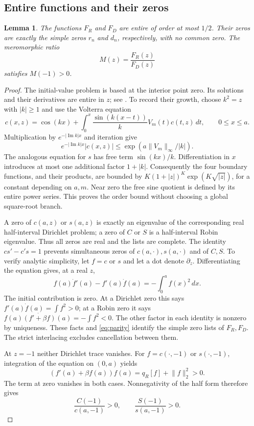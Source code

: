 \documentclass[11pt]{article}
\newtheorem{lemma}[theorem]{Lemma}
\newcommand{\norm}[1]{\lVert#1\rVert}
\DeclareMathOperator{\Impart}{Im}
\begin{document}
\subsection{Entire functions and their zeros}

\begin{lemma}\label{lem:products}
The functions $F_R$ and $F_D$ are entire of order at most $1/2$.
Their zeros are exactly the simple zeros $r_n$ and $d_n$, respectively,
with no common zero. The meromorphic ratio
\[
 M(z)=\frac{F_R(z)}{F_D(z)}
\]
satisfies $M(-1)>0$.
\end{lemma}

\begin{proof}
The initial-value problem is based at the interior point zero.
Its solutions and their derivatives are entire in $z$; see
\cite[Theorem 9.1]{T}. To record their growth, choose $k^2=z$ with
$|k|\geq1$ and use the Volterra equation
\[
 c(x,z)=\cos(kx)+\int_0^x\frac{\sin(k(x-t))}{k}V_m(t)c(t,z)\,dt,
 \qquad 0\leq x\leq a.
\]
Multiplication by $e^{-|\Impart k|x}$ and iteration give
\[
 e^{-|\Impart k|x}|c(x,z)|\leq\exp(a\norm{V_m}_\infty/|k|).
\] The analogous equation for $s$
has free term $\sin(kx)/k$. Differentiation in $x$ introduces at most
one additional factor $1+|k|$. Consequently the four boundary functions,
and their products, are bounded by
$K(1+|z|)^K\exp(K\sqrt{|z|})$, for a constant depending on $a,m$.
Near zero the free sine quotient is defined by its entire power series.
This proves the order bound without choosing a global square-root branch.

A zero of $c(a,z)$ or $s(a,z)$ is exactly an eigenvalue of the
corresponding real half-interval Dirichlet problem; a zero of $C$ or $S$
is a half-interval Robin eigenvalue. Thus all zeros are real and the
lists are complete. The identity $cs'-c's=1$ prevents simultaneous
zeros of $c(a,\cdot),s(a,\cdot)$ and of $C,S$.
To verify analytic simplicity, let $f=c$ or $s$ and let a dot denote
$\partial_z$. Differentiating the equation gives, at a real $z$,
\[
 f(a)\dot f'(a)-f'(a)\dot f(a)=-\int_0^a f(x)^2\,dx.
\]
The initial contribution is zero. At a Dirichlet zero this says
$f'(a)\dot f(a)=\int f^2>0$; at a Robin zero it says
$f(a)\dot{(f'+\beta f)}(a)=-\int f^2<0$.
The other factor in each identity is nonzero by uniqueness.
These facts and \eqref{eq:parity} identify the simple zero lists of
$F_R,F_D$. The strict interlacing excludes cancellation between them.

At $z=-1$ neither Dirichlet trace vanishes. For $f=c(\cdot,-1)$ or
$s(\cdot,-1)$, integration of the equation on $(0,a)$ yields
\[
 (f'(a)+\beta f(a))f(a)=q_R[f]+\norm{f}_2^2>0.
\]
The term at zero vanishes in both cases. Nonnegativity of the half form
therefore gives
\[
 \frac{C(-1)}{c(a,-1)}>0,\qquad \frac{S(-1)}{s(a,-1)}>0.
\]
\end{proof}
\end{document}
